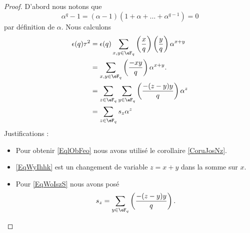 \begin{proof}
    D'abord nous notons que
    \begin{equation}
        \alpha^q-1=(\alpha-1)(1+\alpha+\ldots+\alpha^{q-1})=0
    \end{equation}
    par définition de \( \alpha\). Nous calculons
    \begin{subequations}
        \begin{align}
            \epsilon(q)\tau^2&=\epsilon(q)\sum_{x,y\in \eF_q}\left(\frac{x}{q}\right)\left(\frac{y}{q}\right)\alpha^{x+y}\\
            &=\sum_{x,y\in \eF_q}\left(\frac{-xy}{q}\right)\alpha^{x+y}. \label{EqlObFeo}\\
            &=\sum_{z\in \eF_q}\sum_{y\in \eF_q}\left(\frac{-(z-y)y}{q}\right)\alpha^{z}    \label{EqWyIhhk}\\
            &=\sum_{z\in \eF_q}s_z\alpha^z  \label{EqWoIszS}
        \end{align}
    \end{subequations}
    Justifications :
    \begin{itemize}
        \item 
            Pour obtenir \eqref{EqlObFeo} nous avons utilisé le corollaire \ref{CoruJosNz}. 
        \item
            \eqref{EqWyIhhk} est un changement de variable \( z=x+y\) dans la somme sur \( x\).
        \item
            Pour \eqref{EqWoIszS} nous avons posé
            \begin{equation}
                s_z=\sum_{y\in \eF_q}\left(\frac{-(z-y)y}{q}\right).
            \end{equation}
            

\end{itemize}
\end{proof}
